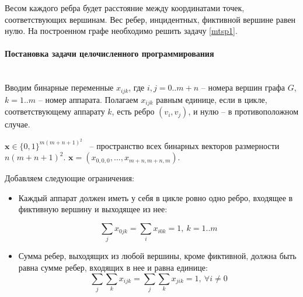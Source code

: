 \documentclass[a4paper,14pt,russian]{article}
\begin{document}
Весом каждого ребра будет расстояние между координатами точек, соответствующих вершинам. Вес ребер, инцидентных, фиктивной вершине равен нулю.
На построенном графе необходимо решить задачу \eqref{mtsp1}.




\paragraph{Постановка задачи целочисленного программирования} ~\\

Вводим бинарные переменные $x_{i j k}$, где $i, j = 0..m+n$ -- номера вершин графа $G$, $k = 1..m$ -- номер аппарата. Полагаем $x_{i j k}$ равным единице, если в цикле, соответствующему аппарату $k$, есть ребро $(v_i, v_j)$, и нулю -- в противоположном случае.

$\mathbf{x} \in \{0,1\}^{m (m+n+1)^2}$ ~-- пространство всех бинарных векторов размерности $n (m+n+1)^2$. $\mathbf{x} = (x_{0, 0, 0}, ..., x_{m+n, m+n, m})$.

Добавляем следующие ограничения:
\begin{itemize}

\item Каждый аппарат должен иметь у себя в цикле ровно одно ребро, входящее в фиктивную вершину и выходящее из нее:

\begin{equation} \label{lin1}
 \displaystyle\sum_j x_{0 j k} = \displaystyle\sum_i x_{i 0 k} = 1, ~k = 1..m
\end{equation}

\item Сумма ребер, выходящих из любой вершины, кроме фиктивной, должна быть равна сумме ребер, входящих в нее и равна единице:
\begin{equation}
\displaystyle\sum_j \displaystyle\sum_k x_{i j k} = \displaystyle\sum_j \displaystyle\sum_k x_{j i k} = 1, ~\forall i \neq 0
\end{equation}

\end{itemize}
\end{document}
